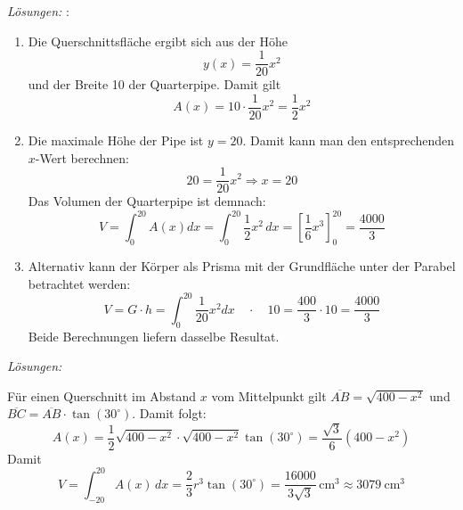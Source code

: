 


\emph{Lösungen:}
:\newline

\begin{enumerate}
	\item Die Querschnittsfläche ergibt sich aus der Höhe
	      \[
		      y(x)=\frac{1}{20}x^2
	      \]
	      und der Breite 10 der Quarterpipe. Damit gilt
	      \[
		      A(x)= 10\cdot \frac{1}{20}x^2 = \frac{1}{2}x^2
	      \]

	\item Die maximale Höhe der Pipe ist \(y=20\). Damit kann man den entsprechenden \(x\)-Wert berechnen:
	      \[ 20 = \frac{1}{20}x^2 \Rightarrow x = 20\]
	      Das Volumen der Quarterpipe ist demnach:
	      \[ V = \int_{0}^{20} A(x) dx = \int_0^{20} \frac{1}{2}x^2\,dx
		      =
		      \left[\frac{1}{6}x^3\right]_0^{20}
		      =
		      \frac{4000}{3}\]

	\item Alternativ kann der Körper als Prisma mit der Grundfläche unter der Parabel betrachtet werden:
	      \[
		      V = G\cdot h = \int_0^{20} \frac{1}{20} x^2 dx  \quad \cdot \quad 10 = \frac{400}{3} \cdot 10 =  \frac{4000}{3}
	      \]
	      Beide Berechnungen liefern dasselbe Resultat.
\end{enumerate}

\emph{Lösungen:}

Für einen Querschnitt im Abstand \(x\) vom Mittelpunkt gilt \(\overline{AB} = \sqrt{400-x^2}\) und \(\overline{BC} = \overline{AB} \cdot \tan(30^\circ)\). Damit folgt:
\[
	A(x)=\frac{1}{2}\sqrt{400-x^2} \cdot \sqrt{400-x^2}\tan(30^\circ) = \frac{\sqrt{3}}{6}\left(400-x^2\right)
\]
Damit
\[
	V=\int_{-20}^{20} A(x)\,dx
	=\frac{2}{3}r^3\tan(30^\circ)
	=\frac{16000}{3\sqrt{3}}\,\si{\centi\metre\cubed}
	\approx \SI{3079}{\centi\metre\cubed}
\]






